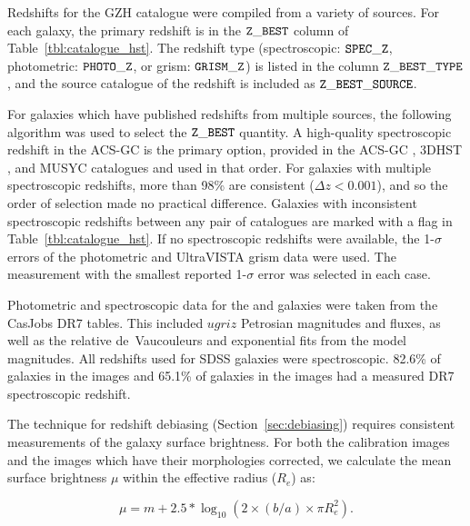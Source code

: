 \documentclass[a4paper,fleqn,usenatbib]{mnras}
\begin{document}
Redshifts for the GZH catalogue were compiled from a variety of sources. For each
galaxy, the primary redshift is in the $\tt Z\_BEST$ column of
Table~\ref{tbl:catalogue_hst}. The redshift type (spectroscopic: $\tt SPEC\_Z$,
photometric: $\tt PHOTO\_Z$, or grism: $ \tt GRISM\_Z$) is listed in the column
$\tt Z\_BEST\_TYPE$, and the source catalogue of the redshift is included as $\tt
Z\_BEST\_SOURCE$. 

For galaxies which have published redshifts from multiple sources, the
following algorithm was used to select the $\tt Z\_BEST$ quantity. A
high-quality spectroscopic redshift in the ACS-GC is the primary option,
provided in the ACS-GC \citep{gri12}, 3DHST \citep{mom15}, and MUSYC
\citep{car10} catalogues and used in that order. For galaxies with multiple
spectroscopic redshifts, more than 98\% are consistent ($\Delta z<0.001$), and
so the order of selection made no practical difference. Galaxies with
inconsistent spectroscopic redshifts between any pair of catalogues are marked
with a flag in Table~\ref{tbl:catalogue_hst}.  If no spectroscopic redshifts were
available, the 1-$\sigma$ errors of the photometric \citep[ACS-GC, 3DHST,
MUSYC, UltraVISTA;][]{ilb13} and UltraVISTA grism data were used. The
measurement with the smallest reported 1-$\sigma$ error was selected in each
case.
 
%

Photometric and spectroscopic data for the \stripe{} and \coadd{} galaxies were taken
from the CasJobs DR7 tables. This included $ugriz$ Petrosian magnitudes and
fluxes, as well as the relative de~Vaucouleurs and exponential fits from the
model magnitudes. All redshifts used for SDSS galaxies were spectroscopic.
82.6\% of galaxies in the \stripe{} images and 65.1\% of galaxies in the
\coadd{} images had a measured DR7 spectroscopic redshift. 

The technique for redshift debiasing (Section~\ref{sec:debiasing}) requires
consistent measurements of the galaxy surface brightness. For both the
\redshifted{} calibration images and the \hst{} images which have their
morphologies corrected, we calculate the mean surface brightness $\mu$ within the
effective radius ($R_e$) as:

\begin{equation}
\mu = m + 2.5*\log_{10}{(2 \times (b/a) \times \pi R_e^2 )}.
\label{eqn:surface_brightness}
\end{equation}
\end{document}
